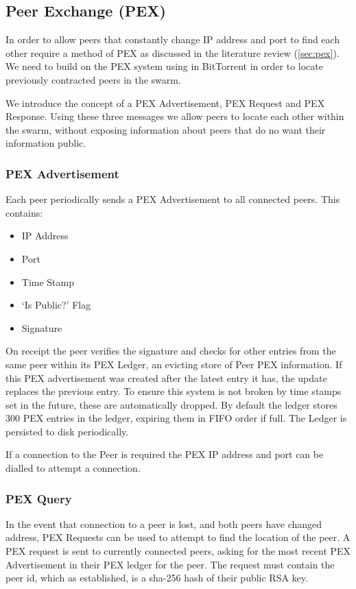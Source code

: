 \documentclass[11pt, a4paper, twocolumn, twoside]{report}
\begin{document}
\subsection{Peer Exchange (PEX)}

In order to allow peers that constantly change IP address and port to find each other require a method of PEX as discussed in the literature review (\ref{sec:pex}). We need to build on the PEX system using in BitTorrent in order to locate previously contracted peers in the swarm.

We introduce the concept of a PEX Advertisement, PEX Request and PEX Response. Using these three messages we allow peers to locate each other within the swarm, without exposing information about peers that do no want their information public.

\subsubsection{PEX Advertisement}

Each peer periodically sends a PEX Advertisement to all connected peers. This contains:

\begin{itemize}
 \item IP Address
 \item Port
 \item Time Stamp
 \item `Is Public?' Flag
 \item Signature
\end{itemize}

On receipt the peer verifies the signature and checks for other entries from the same peer within its PEX Ledger, an evicting store of Peer PEX information. If this PEX advertisement was created after the latest entry it has, the update replaces the previous entry. To ensure this system is not broken by time stamps set in the future, these are automatically dropped. By default the ledger stores 300 PEX entries in the ledger, expiring them in FIFO order if full. The Ledger is persisted to disk periodically.

If a connection to the Peer is required the PEX IP address and port can be dialled to attempt a connection.

\subsubsection{PEX Query}

In the event that connection to a peer is lost, and both peers have changed address, PEX Requests can be used to attempt to find the location of the peer. A PEX request is sent to currently connected peers, asking for the most recent PEX Advertisement in their PEX ledger for the peer. The request must contain the peer id, which as established, is a sha-256 hash of their public RSA key.
\end{document}
